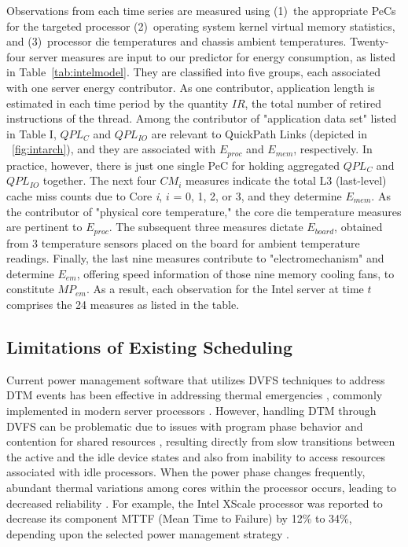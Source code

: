 \documentclass[times, 10pt,twocolumn]{IEEEtran}
\begin{document}
Observations from each time series are measured using (1)~the
appropriate PeCs for the targeted processor (2)~operating system kernel
virtual memory statistics, and (3)~processor die temperatures and
chassis ambient temperatures.  Twenty-four server measures are input to
our predictor for energy consumption, as listed in
Table~\ref{tab:intelmodel}.  They are classified into five groups, each
associated with one server energy contributor.  As one contributor,
application length is estimated in each time period by the quantity
$IR$, the total number of retired instructions of the thread.  Among the
contributor of "application data set" listed in Table I, $QPL_{C}$ and
$QPL_{IO}$ are relevant to QuickPath Links (depicted in
\figurename~\ref{fig:intarch}), and they are associated with $E_{proc}$
and $E_{mem}$, respectively.  In practice, however, there is just one
single PeC for holding aggregated $QPL_{C}$ and $QPL_{IO}$ together.
The next four $CM_{i}$ measures indicate the total L3 (last-level) cache
miss counts due to Core \textit{i}, $i$ = 0, 1, 2, or 3, and they
determine $E_{mem}$.  As the contributor of "physical core temperature,"
the core die temperature measures are pertinent to $E_{proc}$.  The
subsequent three measures dictate $E_{board}$, obtained from 3
temperature sensors placed on the board for ambient temperature
readings.  Finally, the last nine measures contribute to
"electromechanism" and determine $E_{em}$, offering speed information of
those nine memory cooling fans, to constitute $MP_{em}$.  As a result,
each observation for the Intel server at time $t$ comprises the 24
measures as listed in the table.

\subsection{Limitations of Existing Scheduling}
\label{sec:shortc-comp-workl}
Current power management software that utilizes DVFS techniques to
address DTM events has been effective in addressing thermal emergencies
\cite{Donald2006,Hanson2007}, commonly implemented in modern server
processors \cite{AMD2007,Intel2009}.  However, handling DTM through DVFS
can be problematic due to issues with program phase behavior and
contention for shared resources \cite{Bircher2008,Coskun2008d},
resulting directly from slow transitions between the active and the idle
device states and also from inability to access resources associated
with idle processors.  When the power phase changes frequently, abundant
thermal variations among cores within the processor occurs, leading to
decreased reliability \cite{Rosing2007,Coskun2008d,Kursun2009}.  For
example, the Intel XScale processor was reported to decrease its
component MTTF (Mean Time to Failure) by 12\% to 34\%, depending upon
the selected power management strategy \cite{Rosing2007}.
\end{document}
